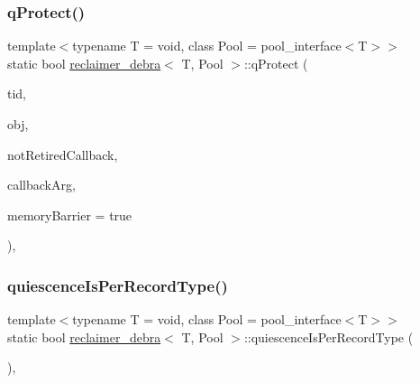 \subsubsection{\texorpdfstring{q\+Protect()}{qProtect()}}
{\footnotesize\ttfamily template$<$typename T  = void, class Pool  = pool\+\_\+interface$<$\+T$>$$>$ \\
static bool \hyperlink{classreclaimer__debra}{reclaimer\+\_\+debra}$<$ T, Pool $>$\+::q\+Protect (\begin{DoxyParamCaption}\item[{const int}]{tid,  }\item[{T $\ast$const}]{obj,  }\item[{\hyperlink{globals_8h_a57f5c0d40b156d7d996492fb2f16e3cd}{Callback\+Type}}]{not\+Retired\+Callback,  }\item[{\hyperlink{globals_8h_a3de64ef48066ac6430631c8b81a15345}{Callback\+Arg}}]{callback\+Arg,  }\item[{bool}]{memory\+Barrier = {\ttfamily true} }\end{DoxyParamCaption})\hspace{0.3cm}{\ttfamily [inline]}, {\ttfamily [static]}}

\mbox{\label{classreclaimer__debra_a5941d65b7837fece5a5c31a08bf4b964}} 
\subsubsection{\texorpdfstring{quiescence\+Is\+Per\+Record\+Type()}{quiescenceIsPerRecordType()}}
{\footnotesize\ttfamily template$<$typename T  = void, class Pool  = pool\+\_\+interface$<$\+T$>$$>$ \\
static bool \hyperlink{classreclaimer__debra}{reclaimer\+\_\+debra}$<$ T, Pool $>$\+::quiescence\+Is\+Per\+Record\+Type (\begin{DoxyParamCaption}{ }\end{DoxyParamCaption})\hspace{0.3cm}{\ttfamily [inline]}, {\ttfamily [static]}}

\mbox{\label{classreclaimer__debra_a16b1929a93855ec60712cb0b7e445280}} 

